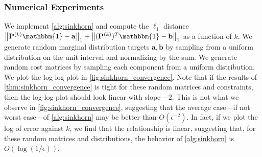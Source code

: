 \documentclass{article}
\renewcommand{\b}{\mathbf}
\newcommand{\one}{\mathbbm{1}}
\theoremstyle{definition}
\theoremstyle{remark}
\begin{document}
\subsubsection{Numerical Experiments}
\label{sub:numerical_sink}
We implement \cref{alg:sinkhorn} and compute the $\ell_1$ distance $\norm{\b P^{
(k)}\one - \b a}_1 + \norm{(\b P^{(k)})^T\one - \b b}_1$ as a function of $k$.
 We generate random marginal distribution targets $\b a, \b b$ by sampling
 from a uniform distribution on the unit interval and normalizing by the sum. We
 generate random cost matrices by sampling each component from a uniform
 distribution. We plot the log-log plot in \cref{fig:sinkhorn_convergence}. Note
 that if the results of \cref{thm:sinkhorn_convergence} is tight for these
 random matrices and constraints, then the log-log plot should look linear with
 slope $-2$. This is not what we observe in \cref{fig:sinkhorn_convergence},
 suggesting that the average case---if not worst case---of \cref{alg:sinkhorn}
 may be better than $O(\epsilon^{-2})$. In fact, if we plot the log of error
 against $k$, we find that the relationship is linear, suggesting that, for these
 random matrices and distributions, the behavior of \cref{alg:sinkhorn} is
 $O(\log(1/\epsilon))$. 

\end{document}
